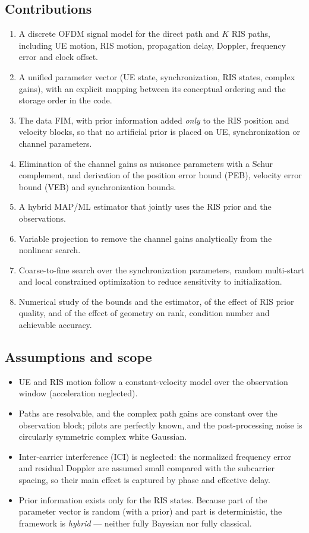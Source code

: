 \documentclass[11pt,a4paper]{article}
\begin{document}
\subsection{Contributions}
\begin{enumerate}
\item A discrete OFDM signal model for the direct path and $K$ RIS paths, including UE motion, RIS motion,
propagation delay, Doppler, frequency error and clock offset.
\item A unified parameter vector (UE state, synchronization, RIS states, complex gains), with an explicit mapping
between its conceptual ordering and the storage order in the code.
\item The data FIM, with prior information added \emph{only} to the RIS position and velocity blocks, so that no
artificial prior is placed on UE, synchronization or channel parameters.
\item Elimination of the channel gains as nuisance parameters with a Schur complement, and derivation of the
position error bound (PEB), velocity error bound (VEB) and synchronization bounds.
\item A hybrid MAP/ML estimator that jointly uses the RIS prior and the observations.
\item Variable projection to remove the channel gains analytically from the nonlinear search.
\item Coarse-to-fine search over the synchronization parameters, random multi-start and local constrained
optimization to reduce sensitivity to initialization.
\item Numerical study of the bounds and the estimator, of the effect of RIS prior quality, and of the effect of
geometry on rank, condition number and achievable accuracy.
\end{enumerate}

\subsection{Assumptions and scope}
\begin{itemize}
\item UE and RIS motion follow a constant-velocity model over the observation window (acceleration neglected).
\item Paths are resolvable, and the complex path gains are constant over the observation block; pilots are
perfectly known, and the post-processing noise is circularly symmetric complex white Gaussian.
\item Inter-carrier interference (ICI) is neglected: the normalized frequency error and residual Doppler are
assumed small compared with the subcarrier spacing, so their main effect is captured by phase and effective
delay.
\item Prior information exists only for the RIS states. Because part of the parameter vector is random (with a
prior) and part is deterministic, the framework is \emph{hybrid} --- neither fully Bayesian nor fully classical.
\end{itemize}
\end{document}
